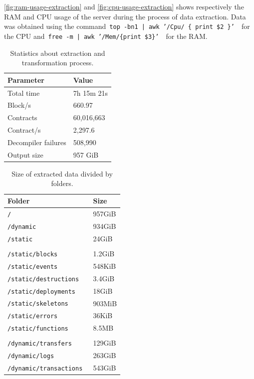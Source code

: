 \cref{fig:ram-usage-extraction} and \cref{fig:cpu-usage-extraction} shows respectively the RAM and CPU usage of the server during the process of data extraction. Data was obtained using the command~{\tt top -bn1 | awk '/Cpu/ \{ print \$2 \}' }~for the CPU and~{\tt free -m | awk '/Mem/\{print \$3\}' }~for the RAM.
  

\begin{table}[H]
\centering
    \begin{threeparttable}
    \begin{tabular}{ m{5cm} m{3cm} } 
    \toprule
    \textbf{Parameter} & \textbf{Value}\\
    \midrule
    Total time   & 7h 15m 21s   \\ [1.2ex]
    Block/s      & 660.97       \\ [1.2ex]
    Contracts    & 60,016,663   \\ [1.2ex]
    Contract/s   & 2,297.6       \\ [1.2ex]
    Decompiler failures & 508,990 \\ [1.2ex]
    Output size  & 957 GiB        \\ [1.2ex]
    \bottomrule
    \end{tabular}
    \end{threeparttable}
    \caption{Statistics about extraction and transformation process.}
    \label{table:extraction-stats}
\end{table}

\begin{table}[H]
\centering
    \begin{threeparttable}
    \begin{tabular}{ m{5cm} m{3cm} } 
    \toprule
    \textbf{Folder} & \textbf{Size}\\
    \midrule
    {\tt / } & 957GiB \\
    {\tt /dynamic }    & 934GiB \\
    {\tt /static }     & 24GiB  \\
    & \\
    {\tt /static/blocks } & 1.2GiB  \\
    {\tt /static/events } & 548KiB    \\
    {\tt /static/destructions } & 3.4GiB    \\
    {\tt /static/deployments } & 18GiB  \\    
    {\tt /static/skeletons } & 903MiB    \\
    {\tt /static/errors } & 36KiB     \\
    {\tt /static/functions } & 8.5MB  \\  
    & \\
    {\tt /dynamic/transfers } & 129GiB    \\
    {\tt /dynamic/logs } & 263GiB    \\
    {\tt /dynamic/transactions } & 543GiB    \\
    \bottomrule
    \end{tabular}
    \end{threeparttable}
    \caption{Size of extracted data divided by folders.}
    \label{table:extraction-output}
\end{table}

